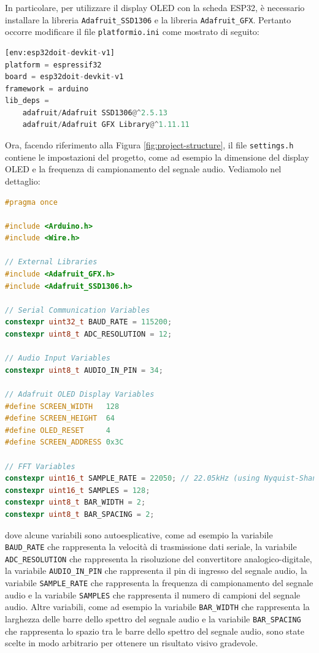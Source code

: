 \documentclass[a4paper,12pt]{report}  %
\newcommand{\lstinlinebg}[1]{\colorbox{backcolour}{\lstinline|#1|}}
\begin{document}
In particolare, per utilizzare il display OLED con la scheda ESP32, è necessario installare la libreria \lstinlinebg{Adafruit_SSD1306} e la libreria \lstinlinebg{Adafruit_GFX}.
Pertanto occorre modificare il file \lstinlinebg{platformio.ini} come mostrato di seguito:

\begin{lstlisting}[language=Python, keywords={platform, board, framework, lib_deps}]
[env:esp32doit-devkit-v1]
platform = espressif32
board = esp32doit-devkit-v1
framework = arduino
lib_deps = 
    adafruit/Adafruit SSD1306@^2.5.13
    adafruit/Adafruit GFX Library@^1.11.11
\end{lstlisting}

Ora, facendo riferimento alla Figura \ref{fig:project-structure}, il file \lstinlinebg{settings.h} contiene le impostazioni del progetto, come ad esempio la dimensione del display OLED e la frequenza di campionamento del segnale audio.
Vediamolo nel dettaglio:

\begin{lstlisting}[language=C++, keywords={constexpr, uint32_t, uint8_t, uint16_t}]
#pragma once

#include <Arduino.h>
#include <Wire.h>

// External Libraries
#include <Adafruit_GFX.h>
#include <Adafruit_SSD1306.h>

// Serial Communication Variables
constexpr uint32_t BAUD_RATE = 115200;
constexpr uint8_t ADC_RESOLUTION = 12;

// Audio Input Variables
constexpr uint8_t AUDIO_IN_PIN = 34;

// Adafruit OLED Display Variables
#define SCREEN_WIDTH   128
#define SCREEN_HEIGHT  64
#define OLED_RESET     4
#define SCREEN_ADDRESS 0x3C

// FFT Variables
constexpr uint16_t SAMPLE_RATE = 22050; // 22.05kHz (using Nyquist-Shannon Theorem)
constexpr uint16_t SAMPLES = 128;
constexpr uint8_t BAR_WIDTH = 2;
constexpr uint8_t BAR_SPACING = 2;
\end{lstlisting}

dove alcune variabili sono autoesplicative, come ad esempio la variabile \lstinlinebg{BAUD_RATE} che rappresenta la velocità di trasmissione dati seriale, la variabile \lstinlinebg{ADC_RESOLUTION} che rappresenta la risoluzione del convertitore analogico-digitale, la variabile \lstinlinebg{AUDIO_IN_PIN} che rappresenta il pin di ingresso del segnale audio, la variabile \lstinlinebg{SAMPLE_RATE} che rappresenta la frequenza di campionamento del segnale audio e la variabile \lstinlinebg{SAMPLES} che rappresenta il numero di campioni del segnale audio.
Altre variabili, come ad esempio la variabile \lstinlinebg{BAR_WIDTH} che rappresenta la larghezza delle barre dello spettro del segnale audio e la variabile \lstinlinebg{BAR_SPACING} che rappresenta lo spazio tra le barre dello spettro del segnale audio, sono state scelte in modo arbitrario per ottenere un risultato visivo gradevole.
\end{document}
